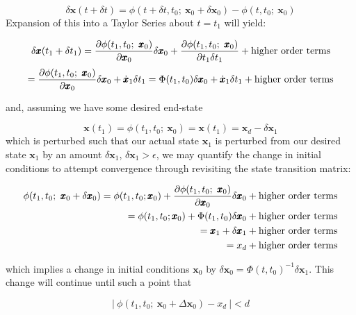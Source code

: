 \begin{equation}
\delta \pmb{x}(t+\delta t) = \phi (t+\delta t, t_0;~\pmb{x}_0 + \delta \pmb{x}_0) - \phi(t, t_0;~\pmb{x}_0)
\end{equation}
\noindent Expansion of this into a Taylor Series about $t = t_1$ will yield:

\begin{equation}
\delta \pmb{x}(t_1 + \delta t_1 ) = \frac{\partial\phi (t_1, t_0;~\pmb{x}_0)}{\partial \pmb{x}_0} \delta \pmb{x}_0 + \frac{\partial\phi (t_1, t_0;~\pmb{x}_0)}{\partial t_1 \delta t_1} + \textnormal{higher order terms}
\end{equation}
\begin{equation}
= \frac{\partial\phi (t_1, t_0;~\pmb{x}_0)}{\partial \pmb{x}_0} \delta \pmb{x}_0 + \dot{\pmb{x}}_1 \delta t_1 = \Phi(t_1, t_0) \delta \pmb{x}_0 + \dot{\pmb{x}}_1 \delta t_1 + \textnormal{higher order terms}
\end{equation}

\noindent and, assuming we have some desired end-state

\begin{equation}
\pmb{x}(t_1) = \phi(t_1, t_0;~\pmb{x}_0) = \pmb{x}(t_1) = \pmb{x}_d - \delta \pmb{x}_1
\end{equation}
\noindent which is perturbed such that our actual state $\pmb{x}_1$ is perturbed from our desired state $\pmb{x}_1$ by an amount $\delta \pmb{x}_1$, $\delta \pmb{x}_1 > \epsilon$, we may quantify the change in initial conditions to attempt convergence through revisiting the state transition matrix:

\begin{align}
\phi(t_1, t_0; ~\pmb{x}_0 + \delta \pmb{x}_0) = \phi(t_1, t_0; \pmb{x}_0) + \frac{\partial\phi (t_1, t_0;~\pmb{x}_0)}{\partial \pmb{x}_0} \delta \pmb{x}_0 + \textnormal{higher order terms} \\
= \phi(t_1, t_0; \pmb{x}_0) + \Phi(t_1, t_0) \delta \pmb{x}_0  + \textnormal{higher order terms}\\
= \pmb{x}_1 + \delta\pmb{x}_1 + \textnormal{higher order terms} \\
= x_d  + \textnormal{higher order terms}
\end{align}

\noindent which implies a change in initial conditions $\pmb{x}_0$ by $\delta \pmb{x}_0 = \Phi (t, t_0)^{-1}\delta\pmb{x}_1$. This change will continue until such a point that

\begin{equation}
|~\phi(t_1, t_0; ~\pmb{x}_0 + \Delta\pmb{x}_0) - x_d~| < d
\end{equation}

